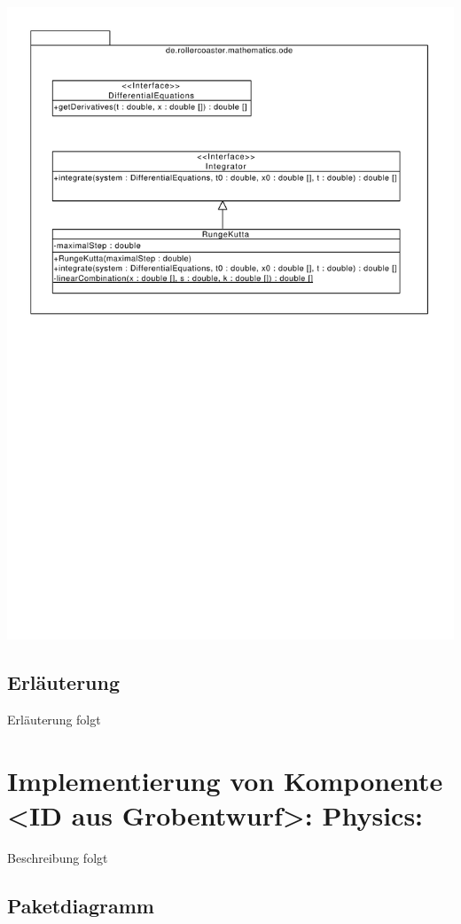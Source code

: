 \includegraphics[width=\linewidth]{bilder/Mathematics_ODE}

\subsection{Erläuterung}

Erläuterung folgt

\section{Implementierung von Komponente
         <ID aus Grobentwurf>: Physics:}

Beschreibung folgt

\subsection{Paketdiagramm}

